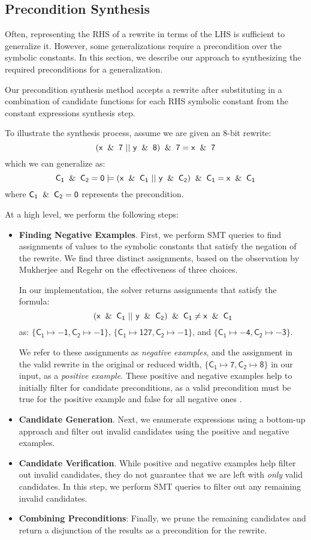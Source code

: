 \documentclass[review, anonymous, acmsmall]{acmart}
\newcommand{\blockmath}[1]{\[\mathsf{#1}\]}
\newcommand{\inline}[1]{$\mathsf{#1}$}
\begin{document}
\subsection{Precondition Synthesis}

Often, representing the RHS of a rewrite in terms of the LHS is sufficient to generalize it. However, some generalizations require a precondition over the symbolic constants. In this section, we describe our approach to synthesizing the required preconditions for a generalization. 

Our precondition synthesis method accepts a rewrite after substituting in a combination of candidate functions for each RHS symbolic constant from the constant expressions synthesis step.

To illustrate the synthesis process, assume we are given an 8-bit rewrite:
\blockmath{(x \And 7\ ||\ y \And 8) \And 7 = x \And 7}
which we can generalize as:
\blockmath{C_1 \And C_2 = 0 \models (x \And C_1\ ||\ y \And C_2) \And C_1 = x \And C_1}
where \inline{C_1 \And C_2 = 0} represents the precondition.

At a high level, we perform the following steps:
\begin{itemize}
    \item \textbf{Finding Negative Examples}. First, we perform SMT queries to find assignments of values to the symbolic constants that satisfy the negation of the rewrite. We find three distinct assignments, based on the observation by Mukherjee and Regehr \cite{mukherjee_hydra_2024} on the effectiveness of three choices.

    In our implementation, the solver returns assignments that satisfy the formula:
        \blockmath{(x \And C_1\ ||\ y \And C_2) \And C_1 \neq x \And C_1}
    as: \inline{\{C_1 \mapsto {-1}, C_2 \mapsto {-1} \}}, \inline{\{C_1 \mapsto 127, C_2 \mapsto -1 \}}, and \inline{\{C_1 \mapsto {-4}, C_2 \mapsto {-3} \}}. 
    
    We refer to these assignments as \textit{negative examples}, and the assignment in the valid rewrite in the original or reduced width, \inline{\{C_1 \mapsto 7, C_2 \mapsto 8 \}} in our input, as a \textit{positive example}. These positive and negative examples help to initially filter for candidate preconditions, as a valid precondition must be true for the positive example and false for all negative ones \cite{mukherjee_hydra_2024}.  

    \item \textbf{Candidate Generation}. Next, we enumerate expressions using a bottom-up approach and filter out invalid candidates using the positive and negative examples. 
    
    \item \textbf{Candidate Verification}. While positive and negative examples help filter out invalid candidates, they do not guarantee that we are left with \textit{only} valid candidates. In this step, we perform SMT queries to filter out any remaining invalid candidates. 
    \item \textbf{Combining Preconditions}: Finally, we prune the remaining candidates and return a disjunction of the results as a precondition for the rewrite.  
\end{itemize}
\end{document}
